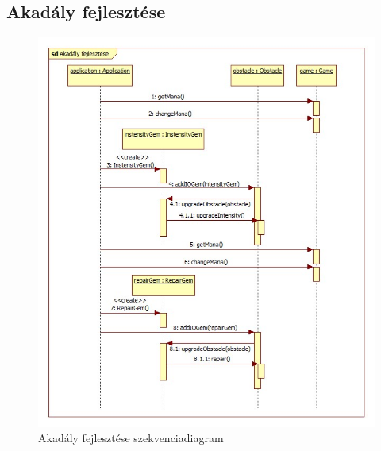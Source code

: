 \subsection{Akadály fejlesztése}
\begin{figure}[H]
\begin{center}
\includegraphics[width=17cm]{chapters/chapter05/images/sd_Akadaly_fejlesztese.jpg}
\caption{Akadály fejlesztése szekvenciadiagram}
\label{fig:sd_Akadaly_fejlesztese}
\end{center}
\end{figure}

